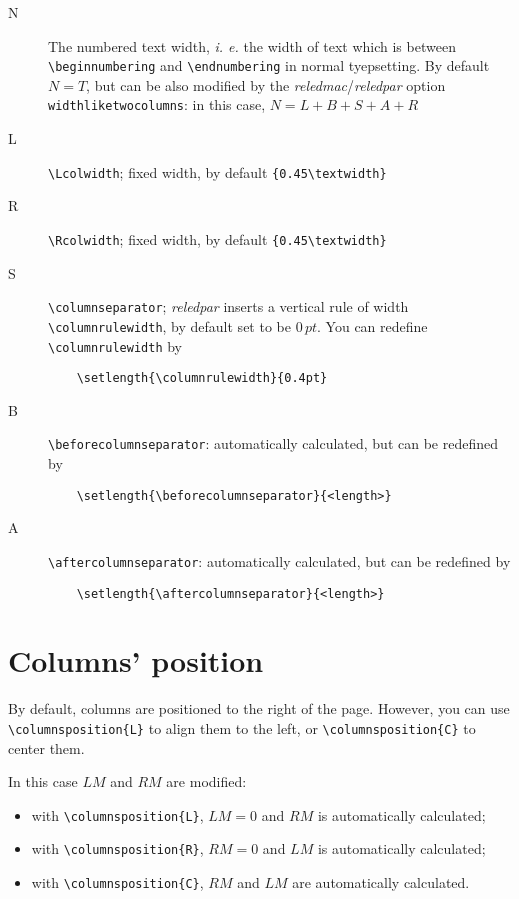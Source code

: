 \documentclass[11pt,a4paper]{article}
\newcommand{\package}[1]{\emph{#1}}
\begin{document}
\begin{description}	
	\item[N] The numbered text width, \emph{i. e.} the width of text which is between \verb+\beginnumbering+ and \verb+\endnumbering+ in normal tyepsetting. By default $N=T$, but can be also modified by the \package{reledmac}/\package{reledpar} option \verb!widthliketwocolumns!: in this case, $N=L+B+S+A+R$
	
	\item[L] \verb!\Lcolwidth!; fixed width, by default \verb!{0.45\textwidth}!
	
	\item[R] \verb!\Rcolwidth!; fixed width, by default \verb!{0.45\textwidth}!
	
	\item[S] \verb!\columnseparator!; \package{reledpar} inserts a vertical rule of width \verb!\columnrulewidth!, by default set to be $0\,pt$. You can redefine \verb!\columnrulewidth! by
	
\begin{verbatim}
	\setlength{\columnrulewidth}{0.4pt}
\end{verbatim}
	
	\item[B] \verb!\beforecolumnseparator!: automatically calculated, but can be redefined by
	
\begin{verbatim}
	\setlength{\beforecolumnseparator}{<length>}
\end{verbatim}
	
	\item[A] \verb!\aftercolumnseparator!: automatically calculated, but can be redefined by

\begin{verbatim}
	\setlength{\aftercolumnseparator}{<length>}
\end{verbatim}

\end{description}

\section{Columns' position}
By default, columns are positioned to the right of the page. However, you can use
\verb!\columnsposition{L}! to align them to the left, or \verb!\columnsposition{C}! to center
them.

In this case $LM$ and $RM$ are modified:

\begin{itemize}
	\item with \verb!\columnsposition{L}!, $LM=0$ and $RM$ is automatically calculated;
	\item with \verb!\columnsposition{R}!, $RM=0$ and $LM$ is automatically calculated;
	\item with \verb!\columnsposition{C}!, $RM$ and $LM$ are automatically calculated.
\end{itemize}
\end{document}
